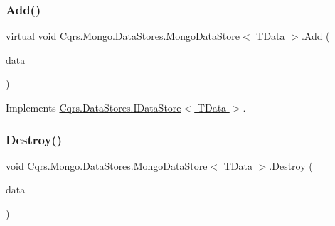 \mbox{\label{classCqrs_1_1Mongo_1_1DataStores_1_1MongoDataStore_a38c242b255dc17cf8d19470fdf5a99bf}} 
\subsubsection{\texorpdfstring{Add()}{Add()}\hspace{0.1cm}{\footnotesize\ttfamily [2/2]}}
{\footnotesize\ttfamily virtual void \hyperlink{classCqrs_1_1Mongo_1_1DataStores_1_1MongoDataStore}{Cqrs.\+Mongo.\+Data\+Stores.\+Mongo\+Data\+Store}$<$ T\+Data $>$.Add (\begin{DoxyParamCaption}\item[{I\+Enumerable$<$ T\+Data $>$}]{data }\end{DoxyParamCaption})\hspace{0.3cm}{\ttfamily [virtual]}}



Implements \hyperlink{interfaceCqrs_1_1DataStores_1_1IDataStore_a906f3f2f80db7a549a4170eca4653e26}{Cqrs.\+Data\+Stores.\+I\+Data\+Store$<$ T\+Data $>$}.

\mbox{\label{classCqrs_1_1Mongo_1_1DataStores_1_1MongoDataStore_af97319aef1f0484666d9ea12578b8df9}} 
\subsubsection{\texorpdfstring{Destroy()}{Destroy()}}
{\footnotesize\ttfamily void \hyperlink{classCqrs_1_1Mongo_1_1DataStores_1_1MongoDataStore}{Cqrs.\+Mongo.\+Data\+Stores.\+Mongo\+Data\+Store}$<$ T\+Data $>$.Destroy (\begin{DoxyParamCaption}\item[{T\+Data}]{data }\end{DoxyParamCaption})}



